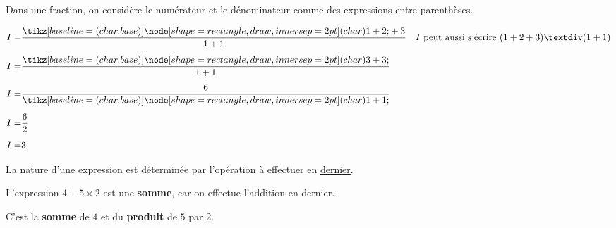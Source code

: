 \documentclass[../€Cours-complet/Cours-complet]{subfiles}
\begin{document}
\begin{cours}
	Dans une fraction, on considère le numérateur et le dénominateur comme des expressions entre parenthèses.
\end{cours}

\begin{exemple}
	\renewcommand{\arraystretch}{1.5}
	\begin{align*}
		I = & \frac{\squared{1 + 2} + 3}{1+1} & I\text{ peut aussi s'écrire }(1+2+3)÷(1+1) \\[0.5em]
		I = & \frac{\squared{3 + 3}}{1+1}     &                                            \\[0.5em]
		I = & \frac{6}{\squared{1+1}   }      &                                            \\[0.5em]
		I = & \frac{6}{2}                     &                                            \\[0.5em]
		I = & 3                               &
	\end{align*}
	\renewcommand{\arraystretch}{1}
\end{exemple}

\begin{cours}
	La nature d'une expression est déterminée par l'opération à effectuer en \uline{dernier}.
\end{cours}

\begin{exemple}
	L'expression $4 + 5 × 2$ est une \textbf{somme}, car on effectue l'addition en dernier.

	C'est la \textbf{somme} de $4$ et du \textbf{produit} de $5$ par $2$.
\end{exemple}
\end{document}
